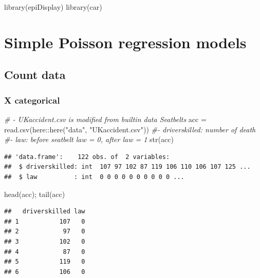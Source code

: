 \documentclass[
]{book}
\makeatletter
\newenvironment{Shaded}{\begin{snugshade}}{\end{snugshade}}
\newcommand{\CommentTok}[1]{\textcolor[rgb]{0.37,0.37,0.37}{\textit{#1}}}
\newcommand{\FunctionTok}[1]{\textcolor[rgb]{0,0,0}{#1}}
\newcommand{\NormalTok}[1]{#1}
\newcommand{\OtherTok}[1]{\textcolor[rgb]{0.37,0.37,0.37}{#1}}
\newcommand{\SpecialCharTok}[1]{\textcolor[rgb]{0,0,0}{#1}}
\newcommand{\StringTok}[1]{\textcolor[rgb]{0.5,0.5,0.5}{#1}}
\newenvironment{kframe}{%
\medskip{}
\setlength{\fboxsep}{.8em}
 \def\at@end@of@kframe{}%
 \ifinner\ifhmode%
  \def\at@end@of@kframe{\end{minipage}}%
  \begin{minipage}{\columnwidth}%
 \fi\fi%
 \def\FrameCommand##1{\hskip\@totalleftmargin \hskip-\fboxsep
 \colorbox{shadecolor}{##1}\hskip-\fboxsep
     \hskip-\linewidth \hskip-\@totalleftmargin \hskip\columnwidth}%
 \MakeFramed {\advance\hsize-\width
   \@totalleftmargin\z@ \linewidth\hsize
   \@setminipage}}%
 {\par\unskip\endMakeFramed%
 \at@end@of@kframe}
\renewenvironment{Shaded}{\begin{kframe}}{\end{kframe}}
\makeatother
\begin{document}
\begin{Shaded}
\begin{Highlighting}[]
\FunctionTok{library}\NormalTok{(epiDisplay)}
\FunctionTok{library}\NormalTok{(car)}
\end{Highlighting}
\end{Shaded}

\hypertarget{simple-poisson-regression-models}{%
\section{Simple Poisson regression models}\label{simple-poisson-regression-models}}

\hypertarget{count-data}{%
\subsection{Count data}\label{count-data}}

\hypertarget{x-categorical}{%
\subsubsection{X categorical}\label{x-categorical}}

\begin{Shaded}
\begin{Highlighting}[]
\CommentTok{\# {-} UKaccident.csv is modified from builtin data Seatbelts}
\NormalTok{acc }\OtherTok{=} \FunctionTok{read.csv}\NormalTok{(here}\SpecialCharTok{::}\FunctionTok{here}\NormalTok{(}\StringTok{"data"}\NormalTok{, }\StringTok{"UKaccident.csv"}\NormalTok{))}
\CommentTok{\#{-} driverskilled: number of death}
\CommentTok{\#{-} law: before seatbelt law = 0, after law = 1}
\FunctionTok{str}\NormalTok{(acc)}
\end{Highlighting}
\end{Shaded}

\begin{verbatim}
## 'data.frame':    122 obs. of  2 variables:
##  $ driverskilled: int  107 97 102 87 119 106 110 106 107 125 ...
##  $ law          : int  0 0 0 0 0 0 0 0 0 0 ...
\end{verbatim}

\begin{Shaded}
\begin{Highlighting}[]
\FunctionTok{head}\NormalTok{(acc); }\FunctionTok{tail}\NormalTok{(acc)}
\end{Highlighting}
\end{Shaded}

\begin{verbatim}
##   driverskilled law
## 1           107   0
## 2            97   0
## 3           102   0
## 4            87   0
## 5           119   0
## 6           106   0
\end{verbatim}
\end{document}
